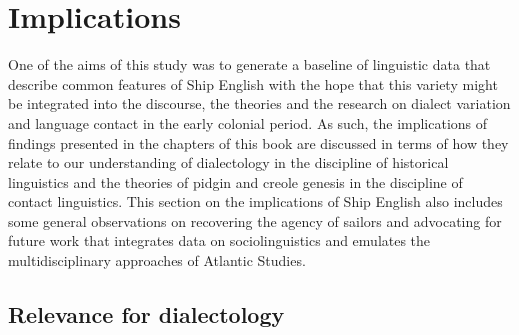 \section{\textbf{Implications}}%

  One of the aims of this study was to generate a baseline of linguistic data that describe common features of Ship English with the hope that this variety might be integrated into the discourse, the theories and the research on dialect variation and language contact in the early colonial period. As such, the implications of findings presented in the chapters of this book are discussed in terms of how they relate to our understanding of dialectology in the discipline of historical linguistics and the theories of pidgin and creole genesis in the discipline of contact linguistics. This section on the implications of Ship English also includes some general observations on recovering the agency of sailors and advocating for future work that integrates data on sociolinguistics and emulates the multidisciplinary approaches of Atlantic Studies.

\subsection{\textbf{Relevance} \textbf{for} \textbf{dialectology}}%


